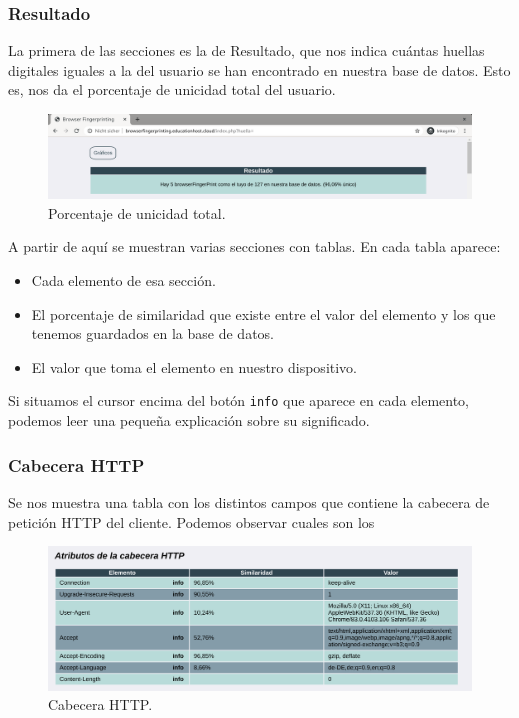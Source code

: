 \subsubsection{Resultado}
La primera de las secciones es la de Resultado, que nos indica cuántas huellas digitales iguales a la del usuario se han encontrado en nuestra base de datos. Esto es, nos da el porcentaje de unicidad total del usuario. \par

\begin{figure}[H]
	\centering
	\includegraphics[width=1\textwidth]{Images/resultadoSection.png}
	\caption{Porcentaje de unicidad total.}
	\label{fig:resultadoSection}
\end{figure}

A partir de aquí se muestran varias secciones con tablas. En cada tabla aparece:
\begin{itemize}
	\item Cada elemento de esa sección.
	\item El porcentaje de similaridad que existe entre el valor del elemento y los que tenemos guardados en la base de datos.
	\item El valor que toma el elemento en nuestro dispositivo.
\end{itemize}

Si situamos el cursor encima del botón \texttt{info} que aparece en cada elemento, podemos leer una pequeña explicación sobre su significado.

\subsubsection{Cabecera HTTP}
Se nos muestra una tabla con los distintos campos que contiene la cabecera de petición HTTP del cliente. Podemos observar cuales son los

\begin{figure}[H]
	\centering
	\includegraphics[width=1\textwidth]{Images/headersSection.png}
	\caption{Cabecera HTTP.}
	\label{fig:headersSection}
\end{figure}


